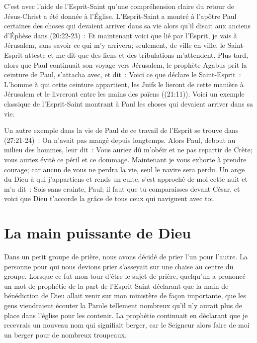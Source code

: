C'est avec l'aide de l'Esprit-Saint qu'une compréhension claire
 du retour de Jésus-Christ a été donnée à l'Église.
 L'Esprit-Saint a montré à l'apôtre Paul certaines des choses
 qui devaient arriver dans sa vie alors qu'il disait aux anciens d'Éphèse
 dans (20:22-23)~:
 \og Et maintenant voici que lié par l'Esprit, je vais à Jérusalem,
 sans savoir ce qui m'y arrivera; seulement, de ville en ville,
 le Saint-Esprit atteste et me dit que des liens
 et des tribulations m'attendent. \fg{}
 Plus tard, alors que Paul continuait son voyage vers Jérusalem,
 le prophète Agabus prit la ceinture de Paul, s'attacha avec, et dit~:
 \og Voici ce que déclare le Saint-Esprit~:
 L'homme à qui cette ceinture appartient, les Juifs le lieront
 de cette manière à Jérusalem et le livreront
 entre les mains des païens \fg{} ((21:11)).
 Voici un exemple classique de l'Esprit-Saint montrant à Paul
 les choses qui devaient arriver dans sa vie.

Un autre exemple dans la vie de Paul de ce travail de l'Esprit
 se trouve dans (27:21-24)~:
 \og On n'avait pas mangé depuis longtemps.
 Alors Paul, debout au milieu des hommes, leur dit~:
 Vous auriez dû m'obéir et ne pas repartir de Crète;
 vous auriez évité ce péril et ce dommage.
 Maintenant je vous exhorte à prendre courage;
 car aucun de vous ne perdra la vie, seul le navire sera perdu.
 Un ange du Dieu à qui j'appartiens et rends un culte,
 s'est approché de moi cette nuit et m'a dit~:
 Sois sans crainte, Paul; il faut que tu comparaisses devant César,
 et voici que Dieu t'accorde la grâce de tous ceux qui naviguent avec toi. \fg{}


\section*{La main puissante de Dieu}

Dans un petit groupe de prière, nous avons décidé de prier
 l'un pour l'autre.
 La personne pour qui nous devions prier s'asseyait sur une chaise
 au centre du groupe. Lorsque ce fut mon tour d'être le sujet de prière,
 quelqu'un a prononcé un mot de prophétie de la part de l'Esprit-Saint
 déclarant que la main de bénédiction de Dieu allait venir
 sur mon ministère de façon importante, que les gens viendraient écouter
 la Parole tellement nombreux qu'il n'y aurait plus de place dans l'église
 pour les contenir.
 La prophétie continuait en déclarant que je recevrais un nouveau nom
 qui signifiait berger, car le Seigneur alors faire de moi un berger
 pour de nombreux troupeaux.

